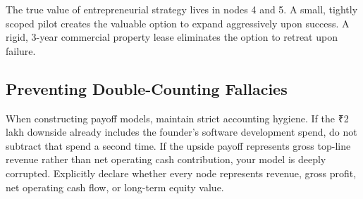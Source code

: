 The true value of entrepreneurial strategy lives in nodes 4 and 5. A small, tightly scoped pilot creates the valuable option to expand aggressively upon success. A rigid, 3-year commercial property lease eliminates the option to retreat upon failure.

\subsection{Preventing Double-Counting Fallacies}

When constructing payoff models, maintain strict accounting hygiene. If the ₹2 lakh downside already includes the founder's software development spend, do not subtract that spend a second time. If the upside payoff represents gross top-line revenue rather than net operating cash contribution, your model is deeply corrupted. Explicitly declare whether every node represents revenue, gross profit, net operating cash flow, or long-term equity value.
